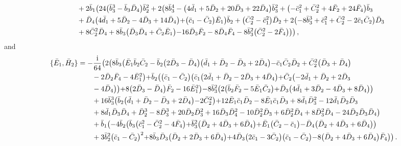 \documentclass[10pt]{amsart}
\theoremstyle{definition}
\theoremstyle{corollary}
\theoremstyle{remark}
\theoremstyle{conclusion}
\begin{document}
\begin{align}
	& \hskip 0.7 cm+2 \bar{b}_1 \bigl(24 \bigl(\bar{b}_3^3-\bar{b}_3 \bar{D}_4\bigl) \bar{b}_2^2+2 \bigl(8 \bar{b}_3^4-\bigl(4 \bar{d}_1+5 \bar{D}_2+20 \bar{D}_3+22 \bar{D}_4\bigl) \bar{b}_3^2+\bigl(-\bar{c}_1^2+\bar{C}_2^2+4 \bar{F}_2+24 \bar{F}_4\bigl) \bar{b}_3  \nonumber\\
	& \hskip 0.7 cm+\bar{D}_4 \bigl(4 \bar{d}_1+5 \bar{D}_2-4 \bar{D}_3+14 \bar{D}_4\bigl)+\bigl(\bar{c}_1-\bar{C}_2\bigl) \bar{E}_1\bigl) \bar{b}_2+\bigl(\bar{C}_2^2-\bar{c}_1^2\bigl) \bar{D}_2+2 \bigl(-8 \bar{b}_3^3+\bar{c}_1^2+\bar{C}_2^2-2 \bar{c}_1 \bar{C}_2\bigl) \bar{D}_3 \nonumber\\
	& \hskip 0.7 cm+8 \bar{C}_2^2 \bar{D}_4+8 \bar{b}_3 \bigl(\bar{D}_3 \bar{D}_4+\bar{C}_2 \bar{E}_1\bigl)-16 \bar{D}_3 \bar{F}_2-8 \bar{D}_4 \bar{F}_4-8 \bar{b}_3^2 \bigl(\bar{C}_2^2-2 \bar{F}_4\bigl)\bigl)\bigl) \, ,
 \end{align} and
 \begin{align} 
	\{\bar{E}_1, \bar{H}_2\}&=-\frac{{\rm i}}{64}  \bigl(2 \bigl(8 \bar{b}_3 \bigl(\bar{E}_1 \bar{b}_2 \bar{C}_2-\bar{b}_2 \bigl(2 \bar{D}_3-\bar{D}_4\bigl) \bigl(\bar{d}_1+\bar{D}_2-\bar{D}_3+2 \bar{D}_4\bigl)-\bar{c}_1 \bar{C}_2 \bar{D}_2+\bar{C}_2^2 \bigl(\bar{D}_3+\bar{D}_4\bigl) \nonumber\\
	&\hskip 0.7cm-2 \bar{D}_2 \bar{F}_4-4 \bar{E}_1^2\bigl)+\bar{b}_2 \bigl(\bigl(\bar{c}_1-\bar{C}_2\bigl) \bigl(\bar{c}_1 \bigl(2 \bar{d}_1+\bar{D}_2-2 \bar{D}_3+4 \bar{D}_4\bigl)+\bar{C}_2 \bigl(-2 \bar{d}_1+\bar{D}_2+2 \bar{D}_3  \nonumber\\
	&\hskip 0.7cm-4 \bar{D}_4\bigl)\bigl)+8 \bigl(2 \bar{D}_3-\bar{D}_4\bigl) \bar{F}_2-16 \bar{E}_1^2\bigl)-8 \bar{b}_3^2 \bigl(2 \bigl(\bar{b}_2 \bar{F}_2-5 \bar{E}_1 \bar{C}_2\bigl)+\bar{D}_3 \bigl(4 \bar{d}_1+3 \bar{D}_2-4 \bar{D}_3+8 \bar{D}_4\bigl)\bigl) \nonumber\\
	&\hskip 0.7cm+16 \bar{b}_3^3 \bigl(\bar{b}_2 \bigl(\bar{d}_1+\bar{D}_2-\bar{D}_3+2 \bar{D}_4\bigl)-2 \bar{C}_2^2\bigl)+12 \bar{E}_1 \bar{c}_1 \bar{D}_2-8 \bar{E}_1 \bar{c}_1 \bar{D}_3+8 \bar{d}_1 \bar{D}_3^2-12 \bar{d}_1 \bar{D}_2 \bar{D}_3 \nonumber\\
	&\hskip 0.7cm+8 \bar{d}_1 \bar{D}_3 \bar{D}_4+\bar{D}_2^3-8 \bar{D}_3^3+20 \bar{D}_2 \bar{D}_3^2+16 \bar{D}_3 \bar{D}_4^2-10 \bar{D}_2^2 \bar{D}_3+6 \bar{D}_2^2 \bar{D}_4+8 \bar{D}_3^2 \bar{D}_4-24 \bar{D}_2 \bar{D}_3 \bar{D}_4\bigl) \nonumber\\
	&\hskip 0.7cm+\bar{b}_1 \bigl(-4 \bar{b}_2 \bigl(\bar{b}_3 \bigl(\bar{c}_1^2-\bar{C}_2^2-4 \bar{F}_4\bigl)+\bar{b}_3^2 \bigl(\bar{D}_2+4 \bar{D}_3+6 \bar{D}_4\bigl)+\bar{E}_1 \bigl(\bar{C}_2-\bar{c}_1\bigl)-\bar{D}_4 \bigl(\bar{D}_2+4 \bar{D}_3+6 \bar{D}_4\bigl)\bigl) \nonumber\\
	&\hskip 0.7cm+3 \bar{b}_2^2 \bigl(\bar{c}_1-\bar{C}_2\bigl)^2+8 \bar{b}_3 \bar{D}_3 \bigl(\bar{D}_2+2 \bar{D}_3+6 \bar{D}_4\bigl)+4 \bar{D}_3 \bigl(2 \bar{c}_1-3 \bar{C}_2\bigl) \bigl(\bar{c}_1-\bar{C}_2\bigl)-8 \bigl(\bar{D}_2+4 \bar{D}_3+6 \bar{D}_4\bigl) \bar{F}_4\bigl)\bigl) \, .
\end{align}
\end{document}
